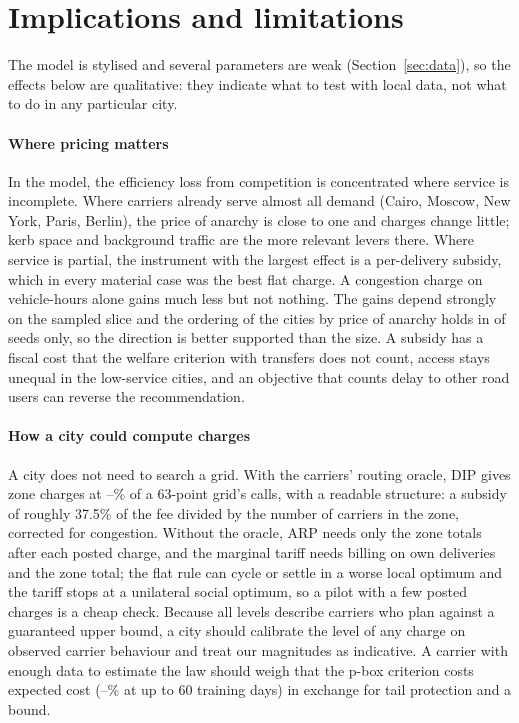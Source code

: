 \documentclass[preprint,11pt]{elsarticle}
\theoremstyle{definition}
\theoremstyle{remark}
\begin{document}
\section{Implications and limitations}\label{sec:discussion}\label{sec:implications}\label{sec:limits}

The model is stylised and several parameters are weak (Section~\ref{sec:data}), so the effects below are qualitative: they indicate what to test with local data, not what to do in any particular city.

\paragraph{Where pricing matters} In the model, the efficiency loss from competition is concentrated where service is incomplete. Where carriers already serve almost all demand (Cairo, Moscow, New York, Paris, Berlin), the price of anarchy is close to one and charges change little; kerb space and background traffic are the more relevant levers there. Where service is partial, the instrument with the largest effect is a per-delivery subsidy, which in every material case was the best flat charge. A congestion charge on vehicle-hours alone gains much less but not nothing. The gains depend strongly on the sampled slice and the ordering of the cities by price of anarchy holds in \TenPoaOrderAll{} of \TenPoaOrderN{} seeds only, so the direction is better supported than the size. A subsidy has a fiscal cost that the welfare criterion with transfers does not count, access stays unequal in the low-service cities, and an objective that counts delay to other road users can reverse the recommendation.

\paragraph{How a city could compute charges} A city does not need to search a grid. With the carriers' routing oracle, DIP gives zone charges at \TenDipCallsNewDelhi--\TenDipCallsLondon\% of a 63-point grid's calls, with a readable structure: a subsidy of roughly 37.5\% of the fee divided by the number of carriers in the zone, corrected for congestion. Without the oracle, ARP needs only the zone totals after each posted charge, and the marginal tariff needs billing on own deliveries and the zone total; the flat rule can cycle or settle in a worse local optimum and the tariff stops at a unilateral social optimum, so a pilot with a few posted charges is a cheap check. Because all levels describe carriers who plan against a guaranteed upper bound, a city should calibrate the level of any charge on observed carrier behaviour and treat our magnitudes as indicative. A carrier with enough data to estimate the law should weigh that the p-box criterion costs expected cost (\AmbRegMin--\AmbRegMax\% at up to 60 training days) in exchange for tail protection and a bound.
\end{document}
